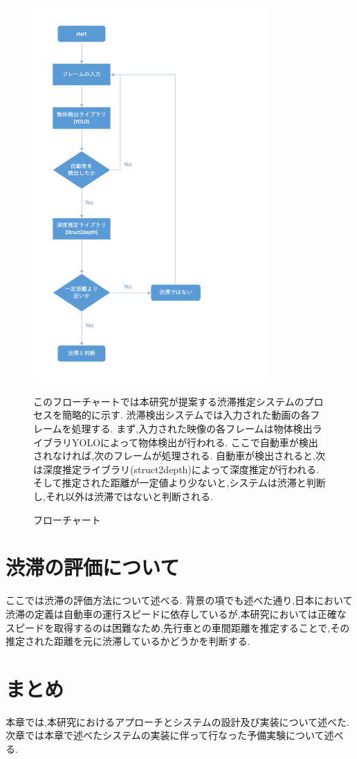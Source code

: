 \begin{figure}[htbp]
  \begin{center}
    \includegraphics[width=9cm]{figs/gp2_flowchart.png}
    \caption{フローチャート}
    \label{fig:system_flow}
    このフローチャートでは本研究が提案する渋滞推定システムのプロセスを簡略的に示す.
    渋滞検出システムでは入力された動画の各フレームを処理する.
    まず,入力された映像の各フレームは物体検出ライブラリYOLOによって物体検出が行われる.
    ここで自動車が検出されなければ,次のフレームが処理される.
    自動車が検出されると,次は深度推定ライブラリ(struct2depth)によって深度推定が行われる.
    そして推定された距離が一定値より少ないと,システムは渋滞と判断し,それ以外は渋滞ではないと判断される.
  \end{center}
\end{figure}

\section{渋滞の評価について}
ここでは渋滞の評価方法について述べる.
背景の項でも述べた通り,日本において渋滞の定義は自動車の運行スピードに依存しているが,本研究においては正確なスピードを取得するのは困難なため,先行車との車間距離を推定することで,その推定された距離を元に渋滞しているかどうかを判断する.

\section{まとめ}
本章では,本研究におけるアプローチとシステムの設計及び実装について述べた.
次章では本章で述べたシステムの実装に伴って行なった予備実験について述べる.